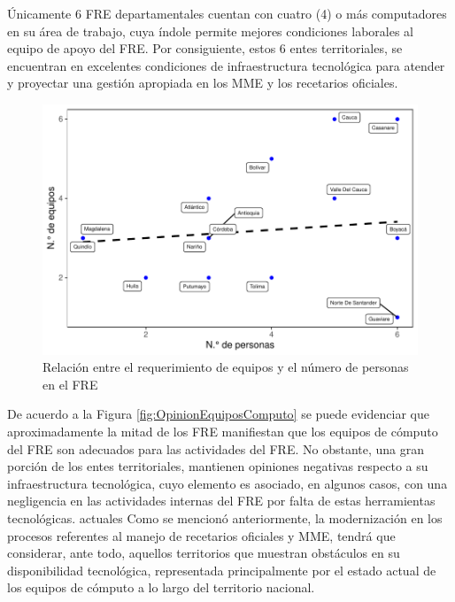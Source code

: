 \documentclass[
]{book}
\begin{document}
Únicamente 6 FRE departamentales cuentan con cuatro (4) o más computadores en su área de trabajo, cuya índole permite mejores condiciones laborales al equipo de apoyo del FRE. Por consiguiente, estos 6 entes territoriales, se encuentran en excelentes condiciones de infraestructura tecnológica para atender y proyectar una gestión apropiada en los MME y los recetarios oficiales.

\begin{figure}
\includegraphics[width=0.85\linewidth]{InformeFinal_files/figure-latex/RelacionEquiposPersonal-1} \caption{Relación entre el requerimiento de equipos y el número de personas en el FRE}\label{fig:RelacionEquiposPersonal}
\end{figure}

De acuerdo a la Figura \ref{fig:OpinionEquiposComputo} se puede evidenciar que aproximadamente la mitad de los FRE manifiestan que los equipos de cómputo del FRE son adecuados para las actividades del FRE. No obstante, una gran porción de los entes territoriales, mantienen opiniones negativas respecto a su infraestructura tecnológica, cuyo elemento es asociado, en algunos casos, con una negligencia en las actividades internas del FRE por falta de estas herramientas tecnológicas. actuales Como se mencionó anteriormente, la modernización en los procesos referentes al manejo de recetarios oficiales y MME, tendrá que considerar, ante todo, aquellos territorios que muestran obstáculos en su disponibilidad tecnológica, representada principalmente por el estado actual de los equipos de cómputo a lo largo del territorio nacional.
\end{document}
